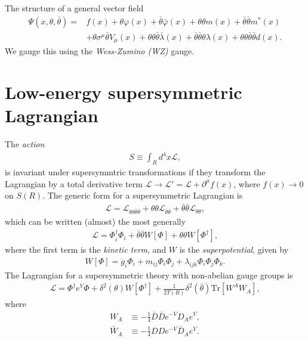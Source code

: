 \documentclass[twoside,english]{uiofysmaster}
\begin{document}
The structure of a general vector field
\begin{align}
\Psi (x, \theta, \bar{\theta}) =& f(x) + \theta \varphi (x) + \bar{\theta} \bar{\varphi} (x) + \theta \theta m(x) + \bar{\theta} \bar{\theta} m^* (x)\\
&+ \theta \sigma^{\mu} \bar{\theta} V_{\mu} (x) + \theta \theta \bar{\theta} \bar{\lambda} (x) + \bar{\theta} \bar{\theta} \theta \lambda (x) + \theta \theta \bar{\theta} \bar{\theta} d(x). 
\end{align}
We gauge this using the \textit{Wess-Zumino (WZ)} gauge.

\section{Low-energy supersymmetric Lagrangian}

The \textit{action}
\begin{align}
S \equiv \int_R d^4x \mathcal{L},
\end{align}
is invariant under supersymmtric transformations if they transform the Lagrangian by a total derivative term $\mathcal{L} \rightarrow \mathcal{L}' = \mathcal{L} + \partial^{\mu}f(x)$, where $f(x) \rightarrow 0 $ on $S(R)$. The generic form for a supersymmetric Lagrangian is
\begin{align}
\mathcal{L} = \mathcal{L}_{\theta \theta \bar{\theta} \bar{\theta}} + \theta \theta \mathcal{L}_{\bar{\theta} \bar{\theta}} + \bar{\theta} \bar{\theta} \mathcal{L}_{\theta \theta},
\end{align}
which can be written (almost) the most generally
\begin{align}
\mathcal{L} = \Phi_i^{\dagger} \Phi_i + \bar{\theta} \bar{\theta} W[\Phi] + \theta \theta W[\Phi^{\dagger}],
\end{align}
where the first term is the \textit{kinetic term}, and $W$ is the \textit{superpotential}, given by
\begin{align}
W[\Phi] = g_i \Phi_i + m_{ij} \Phi_i \Phi_j + \lambda_{ijk} \Phi_i \Phi_j \Phi_k. 
\end{align}
The Lagrangian for a supersymmetric theory with non-abelian gauge groups is
\begin{align}
\mathcal{L} = \Phi^{\dagger}e^V \Phi + \delta^2(\theta)W[\Phi^{\dagger}] + \frac{1}{2T(R)} \delta^2(\bar{\theta}) \text{Tr}[W^AW_A],
\end{align}
where
\begin{align}
W_A & \equiv - \frac{1}{4} \bar{D} \bar{D} e^{-V} D_A e^V,\\
\bar{W}_{\dot{A}} & \equiv - \frac{1}{4} DDe^{-V}\bar{D}_{\dot{A}} e^V.
\end{align}
\end{document}
